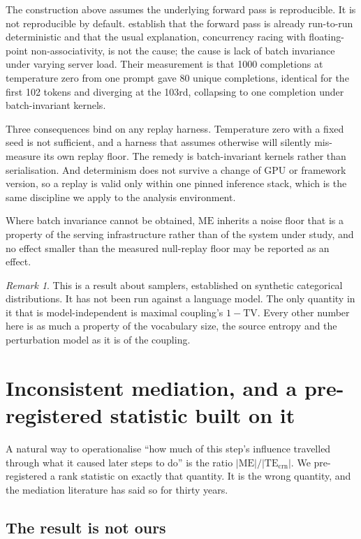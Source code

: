 \documentclass[11pt]{article}
\theoremstyle{remark}
\newtheorem*{remark}{Remark}
\newcommand{\TEcrn}{\mathrm{TE}_{\mathrm{crn}}}
\newcommand{\ME}{\mathrm{ME}}
\newcommand{\TV}{\mathrm{TV}}
\begin{document}
The construction above assumes the underlying forward pass is reproducible. It
is not reproducible by default. \citet{he2025} establish that the forward pass
is already run-to-run deterministic and that the usual explanation, concurrency
racing with floating-point non-associativity, is not the cause; the cause is
lack of batch invariance under varying server load. Their measurement is that
1000 completions at temperature zero from one prompt gave 80 unique
completions, identical for the first 102 tokens and diverging at the 103rd,
collapsing to one completion under batch-invariant kernels.

Three consequences bind on any replay harness. Temperature zero with a fixed
seed is not sufficient, and a harness that assumes otherwise will silently
mis-measure its own replay floor. The remedy is batch-invariant kernels rather
than serialisation. And determinism does not survive a change of GPU or
framework version, so a replay is valid only within one pinned inference stack,
which is the same discipline we apply to the analysis environment.

Where batch invariance cannot be obtained, $\ME$ inherits a noise floor that is
a property of the serving infrastructure rather than of the system under study,
and no effect smaller than the measured null-replay floor may be reported as an
effect.

\begin{remark}
This is a result about samplers, established on synthetic categorical
distributions. It has not been run against a language model. The only quantity
in it that is model-independent is maximal coupling's $1 - \TV$. Every other
number here is as much a property of the vocabulary size, the source entropy and
the perturbation model as it is of the coupling.
\end{remark}

\section{Inconsistent mediation, and a pre-registered statistic built on it}
\label{sec:suppression}

A natural way to operationalise ``how much of this step's influence travelled
through what it caused later steps to do'' is the ratio $|\ME| / |\TEcrn|$. We
pre-registered a rank statistic on exactly that quantity. It is the wrong
quantity, and the mediation literature has said so for thirty years.

\subsection{The result is not ours}
\end{document}
